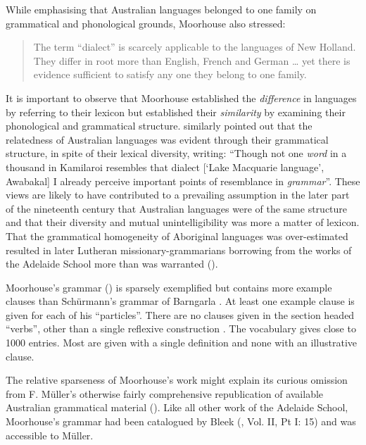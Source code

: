 While emphasising that Australian languages belonged to one family on grammatical and phonological grounds, Moorhouse also stressed:

\begin{quote}
	The term “dialect” is scarcely applicable to the languages of New Holland. They differ in root more than English, French and German … yet there is evidence sufficient to satisfy any one they belong to one family. \citep[v--vi]{moorhouse_vocabulary_1846}
\end{quote}

It is important to observe that Moorhouse established the \textit{difference} in languages by referring to their lexicon but established their \textit{similarity} by examining their phonological and grammatical structure. \citet[293]{ridley_kamilaroi_1856} similarly pointed out that the relatedness of Australian languages was evident through their grammatical structure, in spite of their lexical diversity, writing: “Though not one \textit{word} in a thousand in Kamilaroi resembles that dialect [`Lake Macquarie language’, Awabakal] I already perceive important points of resemblance in \textit{grammar}”. These views are likely to have contributed to a prevailing assumption in the later part of the nineteenth century that Australian languages were of the same structure and that their diversity and mutual unintelligibility was more a matter of lexicon. That the grammatical homogeneity of Aboriginal languages was over-estimated resulted in later Lutheran missionary-grammarians borrowing from the works of the Adelaide School more than was warranted ().

Moorhouse’s grammar (\citeyear{moorhouse_vocabulary_1846}) is sparsely exemplified but contains more example clauses than Schürmann’s grammar of Barngarla \citeyearpar{schurmann_letter_1844}. At least one example clause is given for each of his “particles''. There are no clauses given in the section headed “verbs'', other than a single reflexive construction \citep[20]{moorhouse_vocabulary_1846}. The vocabulary gives close to 1000 entries. Most are given with a single definition and none with an illustrative clause.

The relative sparseness of Moorhouse’s work might explain its curious omission from F. Müller’s otherwise fairly comprehensive republication of available Australian grammatical material (\citeyear{muller_grundris_1882}). Like all other work of the Adelaide School, Moorhouse’s grammar had been catalogued by Bleek (\citeyear{bleek_library_1858}, Vol. II, Pt I: 15) and was accessible to Müller.

